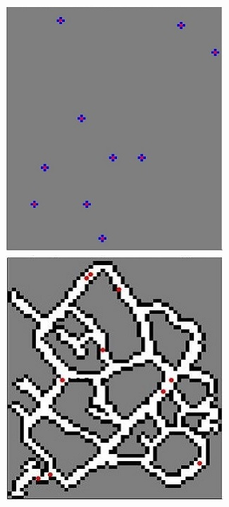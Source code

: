 \documentclass[letterpaper, 9 pt, conference]{ieeeconf}  %
\begin{document}
\begin{figure}

\centering
	\includegraphics[width=0.1\paperheight]{2D_720_initial.jpg}
	\includegraphics[width=0.1\paperheight]{10particles_final.jpg}
	

\end{figure}
\end{document}
